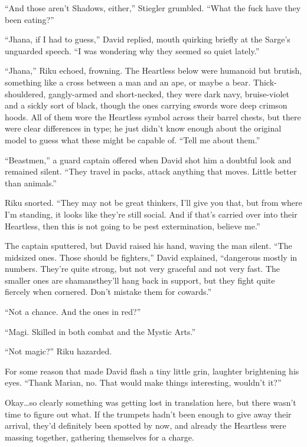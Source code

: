 ``And those aren't Shadows, either,'' Stiegler grumbled. ``What the fuck have they been eating?''

``Jhana, if I had to guess,'' David replied, mouth quirking briefly at the Sarge's unguarded speech. ``I was wondering why they seemed so quiet lately.''

``Jhana,'' Riku echoed, frowning. The Heartless below were humanoid but brutish, something like a cross between a man and an ape, or maybe a bear. Thick-shouldered, gangly-armed and short-necked, they were dark navy, bruise-violet and a sickly sort of black, though the ones carrying swords wore deep crimson hoods. All of them wore the Heartless symbol across their barrel chests, but there were clear differences in type; he just didn't know enough about the original model to guess what these might be capable of. ``Tell me about them.''

``Beastmen,'' a guard captain offered when David shot him a doubtful look and remained silent. ``They travel in packs, attack anything that moves. Little better than animals.''

Riku snorted. ``They may not be great thinkers, I'll give you that, but from where I'm standing, it looks like they're still social. And if that's carried over into their Heartless, then this is not going to be pest extermination, believe me.''

The captain sputtered, but David raised his hand, waving the man silent. ``The midsized ones. Those should be fighters,'' David explained, ``dangerous mostly in numbers. They're quite strong, but not very graceful and not very fast. The smaller ones are shamans\textemdash they'll hang back in support, but they fight quite fiercely when cornered. Don't mistake them for cowards.''

``Not a chance. And the ones in red?''

``Magi. Skilled in both combat and the Mystic Arts.''

``Not magic?'' Riku hazarded.

For some reason that made David flash a tiny little grin, laughter brightening his eyes. ``Thank Marian, no. That would make things interesting, wouldn't it?''

Okay\ldots so clearly something was getting lost in translation here, but there wasn't time to figure out what. If the trumpets hadn't been enough to give away their arrival, they'd definitely been spotted by now, and already the Heartless were massing together, gathering themselves for a charge.

